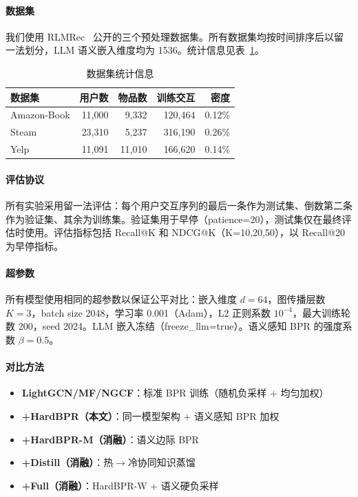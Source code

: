 \documentclass[11pt,a4paper]{article}
\begin{document}
\paragraph{数据集} 我们使用 RLMRec~\cite{Ren2024RLMRec} 公开的三个预处理数据集。所有数据集均按时间排序后以留一法划分，LLM 语义嵌入维度均为 1536。统计信息见表~\ref{tab:datasets}。

\begin{table}[ht]
    \centering
    \caption{数据集统计信息}
    \label{tab:datasets}
    \begin{tabular}{lrrrr}
        \toprule
        数据集 & 用户数 & 物品数 & 训练交互 & 密度 \\
        \midrule
        Amazon-Book & 11,000 & 9,332 & 120,464 & 0.12\% \\
        Steam & 23,310 & 5,237 & 316,190 & 0.26\% \\
        Yelp & 11,091 & 11,010 & 166,620 & 0.14\% \\
        \bottomrule
    \end{tabular}
\end{table}

\paragraph{评估协议} 所有实验采用留一法评估：每个用户交互序列的最后一条作为测试集、倒数第二条作为验证集、其余为训练集。验证集用于早停（patience=20），测试集仅在最终评估时使用。评估指标包括 Recall@K 和 NDCG@K（K=10,20,50），以 Recall@20 为早停指标。

\paragraph{超参数} 所有模型使用相同的超参数以保证公平对比：嵌入维度 $d=64$，图传播层数 $K=3$，batch size 2048，学习率 0.001（Adam），L2 正则系数 $10^{-4}$，最大训练轮数 200，seed 2024。LLM 嵌入冻结（freeze\_llm=true）。语义感知 BPR 的强度系数 $\beta=0.5$。

\paragraph{对比方法}
\begin{itemize}
    \item \textbf{LightGCN/MF/NGCF}：标准 BPR 训练（随机负采样 + 均匀加权）
    \item \textbf{+HardBPR（本文）}：同一模型架构 + 语义感知 BPR 加权
    \item \textbf{+HardBPR-M（消融）}：语义边际 BPR
    \item \textbf{+Distill（消融）}：热$\to$冷协同知识蒸馏
    \item \textbf{+Full（消融）}：HardBPR-W + 语义硬负采样
\end{itemize}
\end{document}
